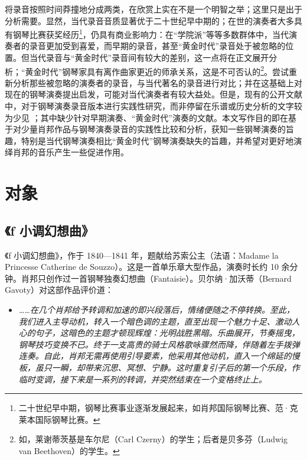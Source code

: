     将录音按照时间莽撞地分成两类，在欣赏上实在不是一个明智之举；这里只是出于分析需要。显然，当代录音音质显著优于二十世纪早中期的；在世的演奏者大多具有钢琴比赛获奖经历\footnote{二十世纪早中期，钢琴比赛事业逐渐发展起来，如肖邦国际钢琴比赛\cite{chopincompetition}、范·克莱本国际钢琴比赛\cite{vancliburn}。}，仍具有商业影响力：在“学院派”等等多数群体中，当代演奏者的录音更加受到喜爱，而早期的录音，甚至“黄金时代”录音处于被忽略的位置。但当代录音与“黄金时代”录音间有较大的差别，这一点将在正文展开分析；“黄金时代”钢琴家具有离作曲家更近的师承关系，这是不可否认的\footnote{如，莱谢蒂茨基是车尔尼（Carl Czerny）的学生；后者是贝多芬（Ludwig van Beethoven）的学生。\cite{lisch}}。尝试重新分析那些被忽略的演奏者的录音，与当代著名的录音进行对比；并在这基础上对现在的钢琴演奏提出启发，可能对当代演奏者有较大益处。但是，现有的公开文献中，对于钢琴演奏录音版本进行实践性研究，而非停留在乐谱或历史分析的文字较为少见 \cite{liyi}；其中缺少针对早期演奏、“黄金时代”演奏的文献。本文写作目的即在基于对少量肖邦作品与钢琴演奏录音的实践性比较和分析，获知一些钢琴演奏的旨趣，特别是当代钢琴演奏相比“黄金时代”钢琴演奏缺失的旨趣，并希望对更好地演绎肖邦的音乐产生一些促进作用。

    \section{\heiti \fontsize{16}{19.2}\selectfont 对象}
    \subsection{\heiti \fontsize{15}{18}\selectfont 《f 小调幻想曲》}

    《f 小调幻想曲》，作于 1840—1841 年，题献给苏索公主（法语：Madame la Princesse Catherine de Souzzo）。这是一首单乐章大型作品，演奏时长约 10 余分钟。肖邦只创作过一首钢琴独奏幻想曲（Fantaisie）。贝尔纳·加沃蒂（Bernard Gavoty）对这部作品评价道：
    \begin{itemize}
        \item[] \textit{……在几个肖邦给予转调和加速的即兴段落后，情绪便随之不停转换。至此，我们进入主导动机，转入一个暗色调的主题，直至出现一个魅力十足、激动人心的句子，这暗色的主题才顿现辉煌：光明战胜黑暗。乐曲展开，节奏摇曳，钢琴技巧变换不已。终于一支高贵的骑士风格歌咏骤然而降，伴随着左手拨弹连奏。自此，肖邦无需再使用引导要素，他采用其他动机，直入一个绵延的慢板，虽只一瞬，却带来沉思、冥想、宁静。这时重复引子后的第一个乐段，作临时变调，接下来是一系列的转调，并突然结束在一个变格终止上。}\cite{bio}
    \end{itemize}
    
